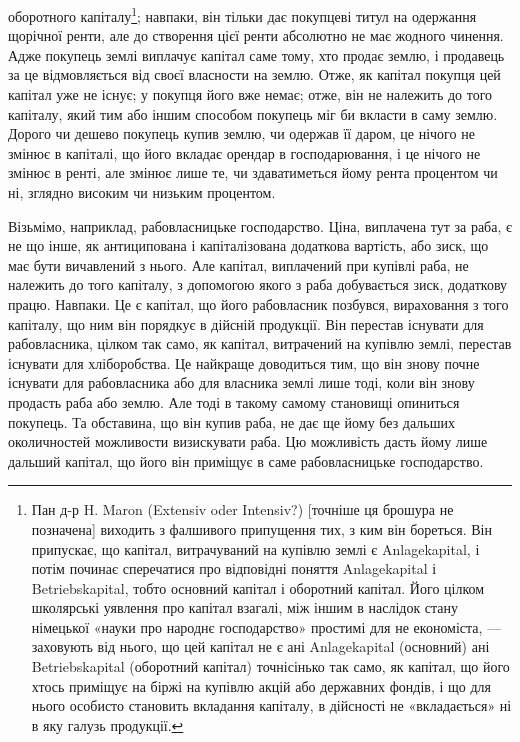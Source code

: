оборотного капіталу\footnote{
Пан д-р H. Maron (Extensiv oder Intensiv?) [точніше ця брошура не позначена] виходить з
фалшивого припущення тих, з ким він бореться. Він припускає, що капітал, витрачуваний на купівлю
землі є Anlagekapital, і потім починає сперечатися про відповідні поняття Anlagekapital і
Betriebskapital, тобто основний капітал і оборотний капітал. Його цілком школярські уявлення про
капітал взагалі, між іншим в наслідок стану німецької «науки про народнє господарство» простимі для
не економіста, — заховують від нього, що цей капітал не є ані Anlagekapital (основний) ані
Betriebskapital
(оборотний капітал) точнісінько так само, як капітал, що його хтось приміщує на біржі на купівлю
акцій або державних фондів, і що для нього особисто становить вкладання капіталу, в дійсності не
«вкладається» ні в яку галузь продукції.
}; навпаки, він тільки дає покупцеві титул на одержання
щорічної ренти, але до створення цієї ренти абсолютно не має жодного чинення.
Адже покупець землі виплачує капітал саме тому, хто продає землю, і продавець
за це відмовляється від своєї власности на землю. Отже, як капітал покупця
цей капітал уже не існує; у покупця його вже немає; отже, він не належить
до того капіталу, який тим або іншим способом покупець міг би вкласти
в саму землю. Дорого чи дешево покупець купив землю, чи одержав її даром,
це нічого не змінює в капіталі, що його вкладає орендар в господарювання, і
це нічого не змінює в ренті, але змінює лише те, чи здаватиметься йому рента
процентом чи ні, зглядно високим чи низьким процентом.

Візьмімо, наприклад, рабовласницьке господарство. Ціна, виплачена тут
за раба, є не що інше, як антиципована і капіталізована додаткова вартість,
або зиск, що має бути вичавлений з нього. Але капітал, виплачений при купівлі
раба, не належить до того капіталу, з допомогою якого з раба добувається
зиск, додаткову працю. Навпаки. Це є капітал, що його рабовласник позбувся,
вираховання з того капіталу, що ним він порядкує в дійсній продукції. Він
перестав існувати для рабовласника, цілком так само, як капітал, витрачений
на купівлю землі, перестав існувати для хліборобства. Це найкраще доводиться
тим, що він знову почне існувати для рабовласника або для власника землі
лише тоді, коли він знову продасть раба або землю. Але тоді в такому самому
становищі опиниться покупець. Та обставина, що він купив раба, не дає ще
йому без дальших околичностей можливости визискувати раба. Цю можливість
дасть йому лише дальший капітал, що його він приміщує в саме рабовласницьке
господарство.

